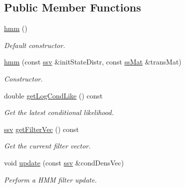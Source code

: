 \subsection*{Public Member Functions}
\begin{DoxyCompactItemize}
\item 
\hyperlink{classhmm_ae7ec1812c1ee0d8ed57eb6c3f62b92a1}{hmm} ()
\begin{DoxyCompactList}\small\item\em Default constructor. \end{DoxyCompactList}\item 
\hyperlink{classhmm_a3ad1950d8fcef28430da0bf435da0a77}{hmm} (const \hyperlink{classcf__filter_a5562e379d385df4d81c949e32d84ee19}{ssv} \&init\+State\+Distr, const \hyperlink{classhmm_a1c1d1649a78ddbe6029556fd1e10d0ab}{ss\+Mat} \&trans\+Mat)
\begin{DoxyCompactList}\small\item\em Constructor. \end{DoxyCompactList}\item 
double \hyperlink{classhmm_ab961ea54f4573a1b1c257162fb264cf7}{get\+Log\+Cond\+Like} () const 
\begin{DoxyCompactList}\small\item\em Get the latest conditional likelihood. \end{DoxyCompactList}\item 
\hyperlink{classcf__filter_a5562e379d385df4d81c949e32d84ee19}{ssv} \hyperlink{classhmm_a71547a134dce31e831004cace2ba4bd7}{get\+Filter\+Vec} () const 
\begin{DoxyCompactList}\small\item\em Get the current filter vector. \end{DoxyCompactList}\item 
void \hyperlink{classhmm_ae294c9e939f3484f00c943f505095971}{update} (const \hyperlink{classcf__filter_a5562e379d385df4d81c949e32d84ee19}{ssv} \&cond\+Dens\+Vec)
\begin{DoxyCompactList}\small\item\em Perform a H\+MM filter update. \end{DoxyCompactList}\end{DoxyCompactItemize}
